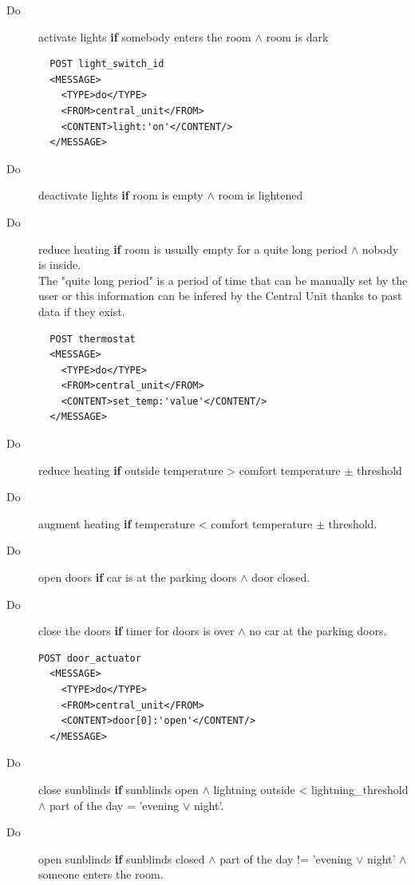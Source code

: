 \documentclass{acm_proc_article-sp}
\begin{document}
\begin{description}
 \item[Do] activate lights \textbf{if} somebody enters the room $\land$ room is dark\\
 \begin{verbatim}
  POST light_switch_id 
  <MESSAGE>
    <TYPE>do</TYPE>
    <FROM>central_unit</FROM>
    <CONTENT>light:'on'</CONTENT/>
  </MESSAGE> 
\end{verbatim}
 \item[Do] deactivate lights \textbf{if} room is empty $\land$ room is lightened
 \item[Do] reduce heating \textbf{if} room is usually empty for a quite long period $\land$ nobody is inside.\\
 The "quite long period" is a period of time that can be manually set by the user or this information can be infered by the Central Unit thanks to past data if they exist.
 \begin{verbatim}
  POST thermostat 
  <MESSAGE>
    <TYPE>do</TYPE>
    <FROM>central_unit</FROM>
    <CONTENT>set_temp:'value'</CONTENT/>
  </MESSAGE> 
\end{verbatim}
 \item[Do] reduce heating \textbf{if} outside temperature > comfort temperature $\pm$ threshold
 \item[Do] augment heating \textbf{if} temperature < comfort temperature $\pm$ threshold.
 \item[Do] open doors \textbf{if} car is at the parking doors $\land$ door closed.
 \item[Do] close the doors \textbf{if} timer for doors is over $\land$ no car at the parking doors.\\
 \begin{verbatim}
POST door_actuator
  <MESSAGE>
    <TYPE>do</TYPE>
    <FROM>central_unit</FROM>
    <CONTENT>door[0]:'open'</CONTENT/>
  </MESSAGE> 
\end{verbatim}
 \item[Do] close sunblinds \textbf{if} sunblinds open $\land$ lightning outside < lightning\_threshold $\land$ part of the day = ’evening $\lor$ night’.
 \item[Do] open sunblinds \textbf{if} sunblinds closed $\land$ part of the day != ’evening $\lor$ night’ $\land$ someone enters the room.
\end{description}
\end{document}
